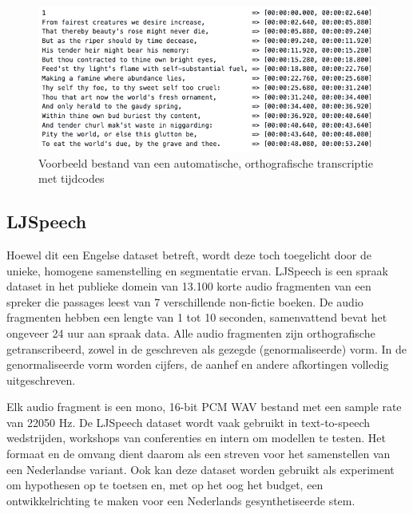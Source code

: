 \begin{table}[]
    \centering
    \caption{Kolommen van een orthografisch transcriptie bestand}
    \label{tab:orthografische_file}
\end{table}

\begin{figure}
    \centering
    \includegraphics[width=\textwidth]{figures/transcription.png}
    \caption{Voorbeeld bestand van een automatische, orthografische transcriptie met tijdcodes}
    \label{fig:aenas}
\end{figure}


\subsection{LJSpeech}
Hoewel dit een Engelse dataset betreft, wordt deze toch toegelicht door de unieke, homogene samenstelling en segmentatie ervan. LJSpeech is een spraak dataset in het publieke domein van 13.100 korte audio fragmenten van een spreker die passages leest van 7 verschillende non-fictie boeken. De audio fragmenten hebben een lengte van 1 tot 10 seconden, samenvattend bevat het ongeveer 24 uur aan spraak data. Alle audio fragmenten zijn orthografische getranscribeerd, zowel in de geschreven als gezegde (genormaliseerde) vorm. In de genormaliseerde vorm worden cijfers, de aanhef en andere afkortingen volledig uitgeschreven.

Elk audio fragment is een mono, 16-bit PCM WAV bestand met een sample rate van 22050 Hz. De LJSpeech dataset wordt vaak gebruikt in text-to-speech wedstrijden, workshops van conferenties en intern om modellen te testen. Het formaat en de omvang dient daarom als een streven voor het samenstellen van een Nederlandse variant. Ook kan deze dataset worden gebruikt als experiment om hypothesen op te toetsen en, met op het oog het budget, een ontwikkelrichting te maken voor een Nederlands gesynthetiseerde stem.

